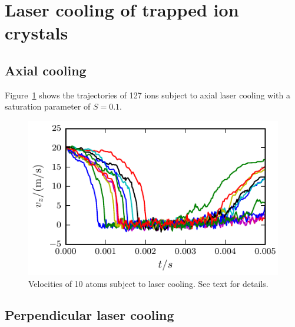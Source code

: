 \documentclass[
  aps,
  reprint,
  twoside,
  showpacs,
  amsmath,
  amssymb,
  floatfix
]{revtex4-1}
\begin{document}
\section{Laser cooling of trapped ion crystals}


\subsection{Axial cooling}

Figure~\ref{fig:FreeSpaceCooling} shows the trajectories of 127 ions
subject to axial laser cooling with a saturation parameter of $S=0.1$.

\begin{figure}
\begin{center}
\includegraphics{figures/freeSpaceCooling}
\end{center}
\caption{Velocities of 10 atoms subject to laser cooling.  See text for
details.}
\label{fig:FreeSpaceCooling}
\end{figure}


\subsection{Perpendicular laser cooling}
\end{document}
